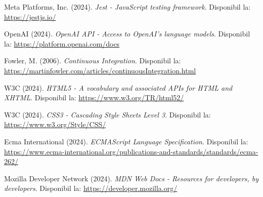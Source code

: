 \documentclass[12pt,a4paper]{report}
\begin{document}
\begin{thebibliography}{20}
Meta Platforms, Inc. (2024). \textit{Jest - JavaScript testing framework}. Disponibil la: \url{https://jestjs.io/}

OpenAI (2024). \textit{OpenAI API - Access to OpenAI's language models}. Disponibil la: \url{https://platform.openai.com/docs}

Fowler, M. (2006). \textit{Continuous Integration}. Disponibil la: \url{https://martinfowler.com/articles/continuousIntegration.html}

W3C (2024). \textit{HTML5 - A vocabulary and associated APIs for HTML and XHTML}. Disponibil la: \url{https://www.w3.org/TR/html52/}

W3C (2024). \textit{CSS3 - Cascading Style Sheets Level 3}. Disponibil la: \url{https://www.w3.org/Style/CSS/}

Ecma International (2024). \textit{ECMAScript Language Specification}. Disponibil la: \url{https://www.ecma-international.org/publications-and-standards/standards/ecma-262/}

Mozilla Developer Network (2024). \textit{MDN Web Docs - Resources for developers, by developers}. Disponibil la: \url{https://developer.mozilla.org/}

\end{thebibliography}
\end{document}
